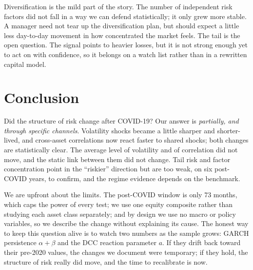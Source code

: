 \documentclass[11pt,a4paper]{article}
\begin{document}
Diversification is the mild part of the story. The number of independent risk factors did not fall in a
way we can defend statistically; it only grew more stable. A manager need not tear up the diversification
plan, but should expect a little less day-to-day movement in how concentrated the market feels. The tail
is the open question. The signal points to heavier losses, but it is not strong enough yet to act on with
confidence, so it belongs on a watch list rather than in a rewritten capital model.

% 
\section{Conclusion}
% 

Did the structure of risk change after COVID-19? Our answer is \emph{partially, and through specific
channels}. Volatility shocks became a little sharper and shorter-lived, and cross-asset correlations now
react faster to shared shocks; both changes are statistically clear. The average level of volatility and
of correlation did not move, and the static link between them did not change. Tail risk and factor
concentration point in the ``riskier'' direction but are too weak, on six post-COVID years, to confirm,
and the regime evidence depends on the benchmark.

We are upfront about the limits. The post-COVID window is only 73 months, which caps the power of every
test; we use one equity composite rather than studying each asset class separately; and by design we use
no macro or policy variables, so we describe the change without explaining its cause. The honest way to
keep this question alive is to watch two numbers as the sample grows: GARCH persistence $\alpha+\beta$ and
the DCC reaction parameter $a$. If they drift back toward their pre-2020 values, the changes we document
were temporary; if they hold, the structure of risk really did move, and the time to recalibrate is now.
\end{document}
